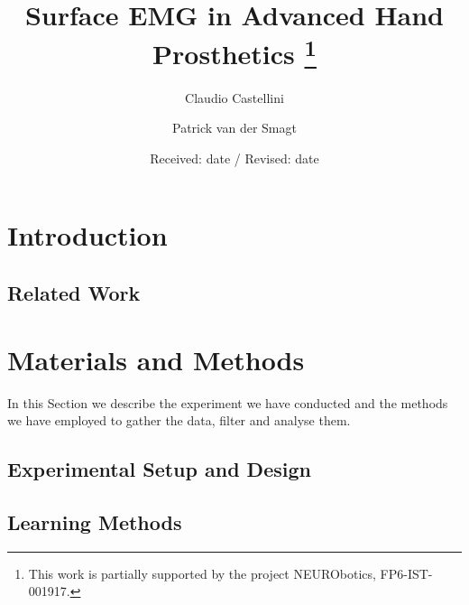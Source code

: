 \documentclass[twocolumn,fleqn,natbib]{svjour2}
\begin{document}
\title{Surface EMG in Advanced Hand Prosthetics
\thanks{This work is partially supported by the project NEURObotics,
FP6-IST-001917.}
}

\author{Claudio Castellini \and Patrick van der Smagt}

\date{Received: date / Revised: date}

\maketitle

\begin{abstract}
  
\end{abstract}


\section{Introduction}
\label{sec:introduction}


\subsection{Related Work}
\label{subsec:relatedwork}


\section{Materials and Methods}
\label{sec:m&ms}

In this Section we describe the experiment we have conducted and the
methods we have employed to gather the data, filter and analyse them.

\subsection{Experimental Setup and Design}
\label{subsec:setup}


\subsection{Learning Methods}
\label{subsec:analysis}

\end{document}
